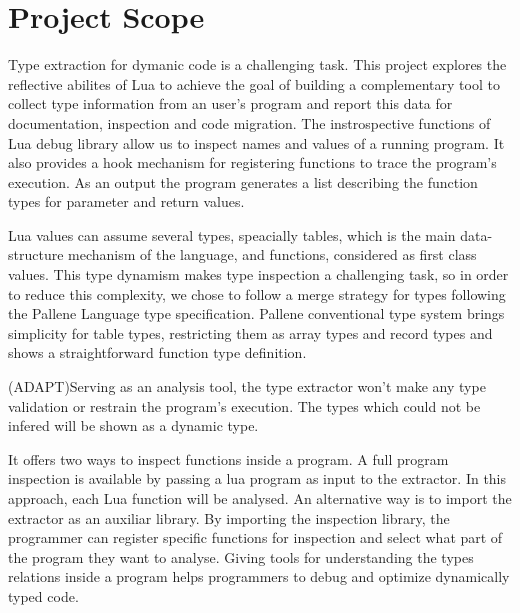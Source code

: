 
\chapter{Project Scope}
\label{cha:Project Scope}
Type extraction for dymanic code is a challenging task. This project explores the reflective abilites of Lua to achieve the goal of building a complementary tool to collect type information from an user's program and report this data for documentation, inspection and code migration. The instrospective functions of Lua debug library allow us to inspect names and values of a running program. It also provides a hook mechanism for registering functions to trace the program's execution. As an output the program generates a list describing the function types for parameter and return values.
\par
Lua values can assume several types, speacially tables, which is the main data-structure mechanism of the language, and functions, considered as first class values. This type dynamism makes type inspection a challenging task, so in order to reduce this complexity, we chose to follow a merge strategy for types following the Pallene Language type specification. Pallene conventional type system brings simplicity for table types, restricting them as array types and record types and shows a straightforward function type definition. 
\par
(ADAPT)Serving as an analysis tool, the type extractor won't make any type validation or restrain the program's execution. The types which could not be infered will be shown as a dynamic type. 
\par
It offers two ways to inspect functions inside a program. A full program inspection is available by passing a lua program as input to the extractor. In this approach, each Lua function will be analysed. An alternative way is to import the extractor as an auxiliar library. By importing the inspection library, the programmer can register specific functions for inspection and select what part of the program they want to analyse. Giving tools for understanding the types relations inside a program helps programmers to debug and optimize dynamically typed code.



